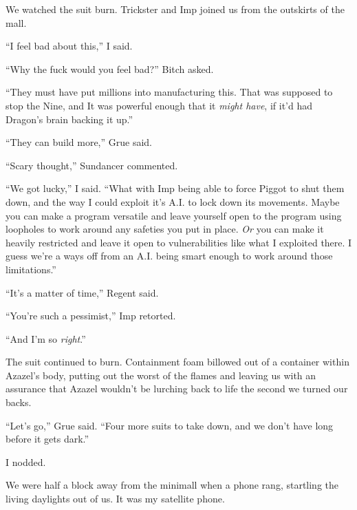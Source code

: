 We watched the suit burn.  Trickster and Imp joined us from the outskirts of the mall.



``I feel bad about this,'' I said.



``Why the fuck would you feel bad?'' Bitch asked.



``They must have put millions into manufacturing this.  That was supposed to stop the Nine, and It was powerful enough that it \emph{might have}, if it'd had Dragon's brain backing it up.''



``They can build more,'' Grue said.



``Scary thought,'' Sundancer commented.



``We got lucky,'' I said.  ``What with Imp being able to force Piggot to shut them down, and the way I could exploit it's A.I. to lock down its movements.  Maybe you can make a program versatile and leave yourself open to the program using loopholes to work around any safeties you put in place.  \emph{Or} you can make it heavily restricted and leave it open to vulnerabilities like what I exploited there.  I guess we're a ways off from an A.I. being smart enough to work around those limitations.''



``It's a matter of time,'' Regent said.



``You're such a pessimist,'' Imp retorted.



``And I'm so \emph{right}.''



The suit continued to burn.  Containment foam billowed out of a container within Azazel's body, putting out the worst of the flames and leaving us with an assurance that Azazel wouldn't be lurching back to life the second we turned our backs.



``Let's go,'' Grue said.  ``Four more suits to take down, and we don't have long before it gets dark.''



I nodded.



We were half a block away from the minimall when a phone rang, startling the living daylights out of us.  It was my satellite phone.



